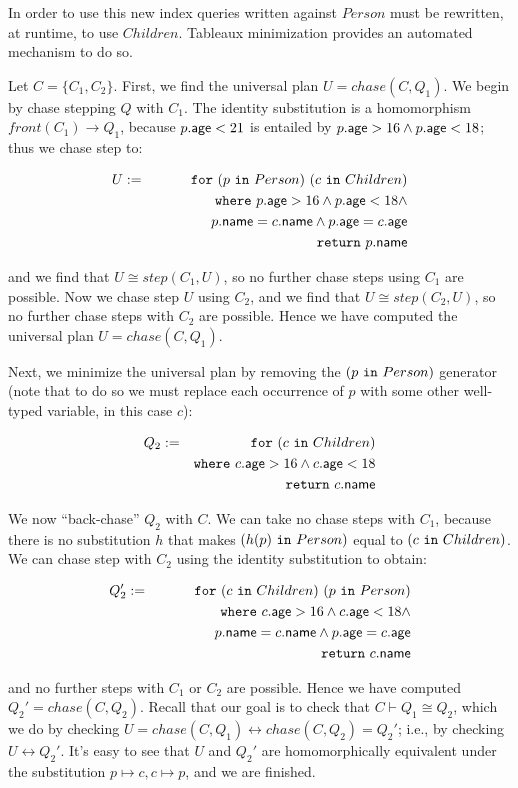 \documentclass[preprint]{sigplanconf}
\newcommand{\FOR}{{\tt for} \ }
\newcommand{\WHERE}{{\tt where} \ }
\newcommand{\IN}{ \ {\tt in} \ }
\newcommand{\RETURN}{{\tt return} \ }
\begin{document}
In order to use this new index queries written against $Person$ must be rewritten, at runtime, to use $Children$.  Tableaux minimization provides an automated mechanism to do so. 

Let $C = \{ C_1, C_2\}$.  First, we find the universal plan $U = chase(C, Q_1)$.  We begin by chase stepping $Q$ with $C_1$.  The identity substitution is a homomorphism $front(C_1) \to Q_1$, because $p.{\sf age} < 21$ is entailed by $p.{\sf age} > 16 \wedge p.{\sf age} < 18$; thus we chase step to:
\begin{normalsize}
\begin{eqnarray*}
U & := & \FOR (p \IN Person) \ (c \IN Children) \\
 & & \WHERE p.{\sf age} > 16 \wedge p.{\sf age} < 18 \wedge \\
 & & \ \ \ \ \ \ \ \ \ \ \ \ p.{\sf name} = c.{\sf name} \wedge p.{\sf age} = c.{\sf age} \\
 & & \RETURN p.{\sf name}
\end{eqnarray*}  
\end{normalsize}
and we find that $U \cong step(C_1, U)$, so no further chase steps using $C_1$ are possible.  Now we chase step $U$ using $C_2$, and we find that $U \cong step(C_2, U)$, so no further chase steps with $C_2$ are possible.  Hence we have computed the universal plan $U = chase(C,Q_1)$.

Next, we minimize the universal plan by removing the $(p \IN Person)$ generator (note that to do so we must replace each occurrence of $p$ with some other well-typed variable, in this case $c$):
\begin{normalsize}
\begin{eqnarray*}
Q_2 & := & \FOR (c \IN Children) \\
 & & \WHERE c.{\sf age} > 16 \wedge c.{\sf age} < 18 \\
  & & \RETURN c.{\sf name}
\end{eqnarray*}  
\end{normalsize}
We now ``back-chase'' $Q_2$ with $C$.  We can take no chase steps with $C_1$, because there is no substitution $h$ that makes $(h(p) \IN Person)$ equal to $(c \IN Children)$.  We can chase step with $C_2$ using the identity substitution to obtain:
\begin{normalsize}
\begin{eqnarray*}
Q_2' & := & \FOR (c \IN Children) \ (p \IN Person) \\
 & & \WHERE c.{\sf age} > 16 \wedge c.{\sf age} < 18 \wedge \\
 & & \ \ \ \ \ \ \ \ \ \ \ \   p.{\sf name} = c.{\sf name} \wedge p.{\sf age} = c.{\sf age}\\
  & & \RETURN c.{\sf name}
\end{eqnarray*}  
\end{normalsize}
and no further steps with $C_1$ or $C_2$ are possible. Hence we have computed $Q_2' = chase(C, Q_2)$.  Recall that our goal is to check that $C \vdash Q_1 \cong Q_2$, which we do by checking $U = chase(C, Q_1) \leftrightarrow chase(C, Q_2) = Q_2'$; i.e., by checking $U \leftrightarrow Q_2'$.  It's easy to see that $U$ and $Q_2'$ are homomorphically equivalent under the substitution $p \mapsto c, c \mapsto p$, and we are finished.   
\end{document}
